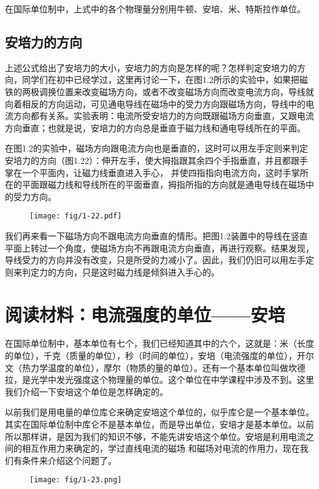 在国际单位制中，上式中的各个物理量分别用牛顿、安培、米、特斯拉作单位。

\subsection{安培力的方向}


上述公式给出了安培力的大小，安培力的方向是怎样的呢？怎样判定安培力的方向，同学们在初中已经学过，这里再讨论一下，在图1.2所示的实验中，如果把磁铁的两极调换位置来改变磁场方向，或者不改变磁场方向而改变电流方向，导线就向着相反的方向运动，可见通电导线在磁场中的受力方向跟磁场方向，导线中的电流方向都有关系。实验表明：电流所受安培力的方向既跟磁场方向垂直，又跟电流方向垂直；也就是说，安培力的方向总是垂直于磁力线和通电导线所在的平面。

在图1.2的实验中，磁场方向跟电流方向也是垂直的，这时可以用左手定则来判定安培力的方向（图1.22）：伸开左手，使大拇指跟其余四个手指垂直，并且都跟手掌在一个平面内，让磁力线垂直进入手心，
并使四指指向电流方向，这时手掌所在的平面跟磁力线和导线所在的平面垂直，拇指所指的方向就是通电导线在磁场中的受力方向。
\begin{figure}[htp]\centering
\texttt{[image: fig/1-22.pdf]}
\caption{}
\end{figure}

我们再来看一下磁场方向不跟电流方向垂直的情形。把图1.2装置中的导线在竖直平面上转过一个角度，使磁场方向不再跟电流方向垂直，再进行观察。结果发现，导线受力的方向并没有改变，只是所受的力减小了。因此，我们仍旧可以用左手定则来判定力的方向，只是这时磁力线是倾斜进入手心的。

\section*{阅读材料：电流强度的单位——安培}
在国际单位制中，基本单位有七个，我们已经知道其中的六个，这就是：米（长度的单位），千克（质量的单位），秒（时间的单位），安培（电流强度的单位），开尔文（热力学温度的单位），摩尔（物质的量的单位）。还有一个基本单位叫做坎德拉，是光学中发光强度这个物理量的单位。这个单位在中学课程中涉及不到。这里我们介绍一下安培这个单位是怎样确定的。

以前我们是用电量的单位库仑来确定安培这个单位的，似乎库仑是一个基本单位。其实在国际单位制中库仑不是基本单位，而是导出单位，安培才是基本单位。以前所以那样讲，是因为我们的知识不够，不能先讲安培这个单位。安培是利用电流之间的相互作用力来确定的，学过直线电流的磁场
和磁场对电流的作用力，现在我们有条件来介绍这个问题了。
\begin{figure}[htp]\centering
	\texttt{[image: fig/1-23.png]}
	\caption{ }
\end{figure}

